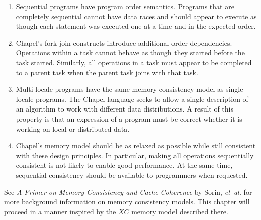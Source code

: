 \begin{enumerate}

  \item Sequential programs have program order semantics.  Programs that
  are completely sequential cannot have data races and should appear to
  execute as though each statement was executed one at a time and in the
  expected order.

  \item Chapel's fork-join constructs introduce additional order
  dependencies.  Operations within a task cannot behave as though they
  started before the task started. Similarly, all operations in a task
  must appear to be completed to a parent task when the parent task joins
  with that task.

  \item Multi-locale programs have the same memory consistency model as
  single-locale programs. The Chapel language seeks to allow a single
  description of an algorithm to work with different data distributions.
  A result of this property is that an expression of a program must be
  correct whether it is working on local or distributed data.

  \item Chapel's memory model should be as relaxed as possible while still
  consistent with these design principles. In particular, making all
  operations sequentially consistent is not likely to enable good
  performance. At the same time, sequential consistency should be
  available to programmers when requested.

\end{enumerate}

See \textit{A Primer on Memory Consistency and Cache Coherence} by
Sorin, \emph{et~al.} for more background information on memory
consistency models. This chapter will proceed in a manner inspired by
the $XC$ memory model described there.






